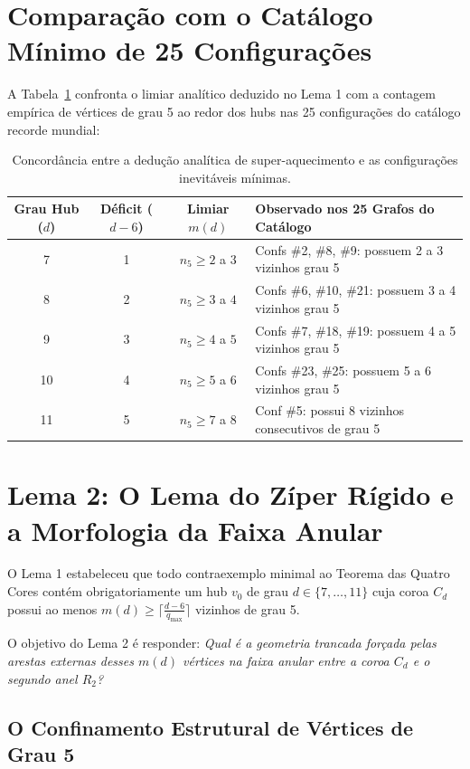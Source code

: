 \documentclass[11pt,a4paper]{article}
\theoremstyle{plain}
\theoremstyle{definition}
\begin{document}
\section{Comparação com o Catálogo Mínimo de 25 Configurações}

A Tabela~\ref{tab:limiares} confronta o limiar analítico deduzido no Lema 1 com a contagem empírica de vértices de grau 5 ao redor dos hubs nas 25 configurações do catálogo recorde mundial:

\begin{table}[htbp]
\centering
\small
\begin{tabular}{c c c p{7.0cm}}
\toprule
\textbf{Grau Hub ($d$)} & \textbf{Déficit ($d - 6$)} & \textbf{Limiar $m(d)$} & \textbf{Observado nos 25 Grafos do Catálogo} \\
\midrule
7  & 1 & $n_5 \ge 2$ a $3$ & Confs \#2, \#8, \#9: possuem 2 a 3 vizinhos grau 5 \\
8  & 2 & $n_5 \ge 3$ a $4$ & Confs \#6, \#10, \#21: possuem 3 a 4 vizinhos grau 5 \\
9  & 3 & $n_5 \ge 4$ a $5$ & Confs \#7, \#18, \#19: possuem 4 a 5 vizinhos grau 5 \\
10 & 4 & $n_5 \ge 5$ a $6$ & Confs \#23, \#25: possuem 5 a 6 vizinhos grau 5 \\
11 & 5 & $n_5 \ge 7$ a $8$ & Conf \#5: possui 8 vizinhos consecutivos de grau 5 \\
\bottomrule
\end{tabular}
\caption{Concordância entre a dedução analítica de super-aquecimento e as configurações inevitáveis mínimas.}
\label{tab:limiares}
\end{table}

\section{Lema 2: O Lema do Zíper Rígido e a Morfologia da Faixa Anular}

O Lema 1 estabeleceu que todo contraexemplo minimal ao Teorema das Quatro Cores contém obrigatoriamente um hub $v_0$ de grau $d \in \{7, \dots, 11\}$ cuja coroa $C_d$ possui ao menos $m(d) \ge \lceil \frac{d - 6}{q_{\max}} \rceil$ vizinhos de grau 5. 

O objetivo do Lema 2 é responder: \emph{Qual é a geometria trancada forçada pelas arestas externas desses $m(d)$ vértices na faixa anular entre a coroa $C_d$ e o segundo anel $R_2$?}

\subsection{O Confinamento Estrutural de Vértices de Grau 5}
\end{document}
